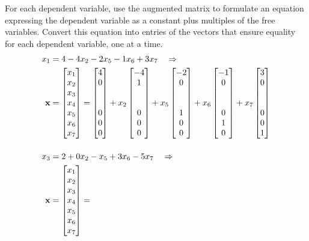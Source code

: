 \documentclass{ximera}
\begin{document}
\begin{example}
    For each dependent variable, use the augmented
  matrix to formulate an equation expressing the dependent variable as
  a constant plus multiples of the free variables.  Convert this
  equation into entries of the vectors that ensure equality for each
  dependent variable, one at a time.
  \begin{align*}
    x_1&=4-4x_2-2x_5-1x_6+3x_7\quad\Rightarrow\\
    \vect{x}&=\colvector{x_1\\x_2\\x_3\\x_4\\x_5\\x_6\\x_7}=
    \colvector{4\\0\\\ \\\ \\0\\0\\0}+
    x_2\colvector{-4\\1\\\ \\\ \\0\\0\\0}+
    x_5\colvector{-2\\0\\\ \\\ \\1\\0\\0}+
    x_6\colvector{-1\\0\\\ \\\ \\0\\1\\0}+
    x_7\colvector{3\\0\\\ \\\ \\0\\0\\1}\\[12pt]
    x_3&=2+0x_2-x_5+3x_6-5x_7\quad\Rightarrow\\
    \vect{x}&=\colvector{x_1\\x_2\\x_3\\x_4\\x_5\\x_6\\x_7}=

\end{align*}
\end{example}
\end{document}
